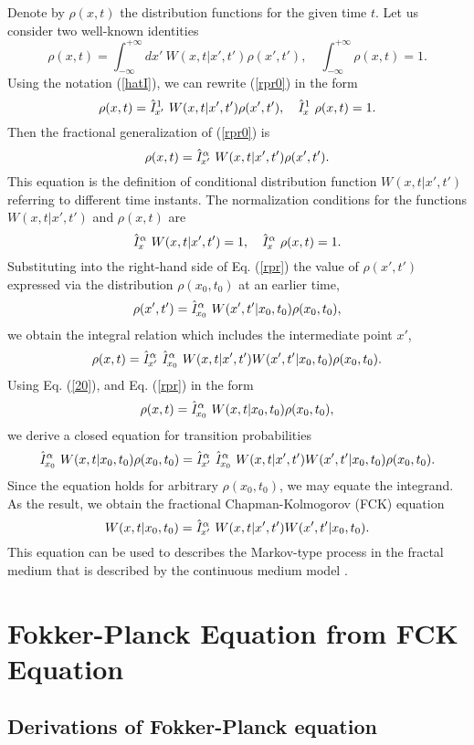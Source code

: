 \documentclass[12pt]{article}
\newcommand{\be}{\begin{equation}}
\newcommand{\ee}{\end{equation}}
\begin{document}
Denote by $\rho(x,t)$ the distribution functions for the given time $t$. 
Let us consider two well-known identities
\be  \label{rpr0} \rho(x,t) = \int^{+\infty}_{-\infty} d{x'}
\ W(x,t|x',t') \rho(x',t') , 
\quad \int^{+\infty}_{-\infty} \rho(x,t)=1 . \ee
Using the notation (\ref{hatI}), we can rewrite (\ref{rpr0})
in the form
\[  \rho(x,t) =\hat {\it I}^{1}_{x'}  \ W(x,t|x',t') \rho(x',t') , \quad
\hat {\it I}^{1}_x  \ \rho(x,t)=1 . \]
Then the fractional generalization of (\ref{rpr0}) is
\be  \label{rpr} \rho(x,t) =
\hat {\it I}^{\alpha}_{x'} \ W(x,t|x',t') \rho(x',t') . \ee
This equation is
the definition of conditional distribution function $W(x,t|x',t')$ 
referring to different time instants.
The normalization conditions for  the functions $W(x,t|x',t')$ 
and $\rho(x,t)$ are 
\be \label{nc-p} \hat {\it I}^{\alpha}_x  \ W(x,t|x',t')=1 , \quad
\hat {\it I}^{\alpha}_x  \ \rho(x,t)=1 . \ee
Substituting into the right-hand side of Eq. (\ref{rpr})
the value of $\rho(x',t')$
expressed via the distribution $\rho(x_0,t_0)$ at an earlier time,
\be  \label{rpr-2} \rho(x',t') =
\hat {\it I}^{\alpha}_{x_0}  \ W(x',t'|x_0,t_0) \rho(x_0,t_0) , \ee
we obtain the integral relation which includes the
intermediate point $x'$,
\be \label{20} \rho(x,t)=
\hat {\it I}^{\alpha}_{x'} \ \hat {\it I}^{\alpha}_{x_0}
 \  W(x,t|x',t')W(x',t'|x_0,t_0) \rho(x_0,t_0) . \ee
Using Eq. (\ref{20}), and Eq. (\ref{rpr}) in the form
\be  \label{rpr-3} \rho(x,t) =
\hat {\it I}^{\alpha}_{x_0}  \ W(x,t|x_0,t_0) \rho(x_0,t_0) , \ee
we derive a closed equation for transition
probabilities
\[ \hat {\it I}^{\alpha}_{x_0}  \ W(x,t|x_0,t_0) \rho(x_0,t_0) =
\hat {\it I}^{\alpha}_{x'}  \ \hat {\it I}^{\alpha}_{x_0}  \
W(x,t|x',t')W(x',t'|x_0,t_0) \rho(x_0,t_0) . \]
Since the equation holds for arbitrary $\rho(x_0,t_0)$,
we may equate the integrand. As the result, we obtain 
the fractional Chapman-Kolmogorov (FCK) equation 
\be W(x,t|x_0,t_0)=\hat {\it I}^{\alpha}_{x'}  \
W(x,t|x',t')W(x',t'|x_0,t_0) . \ee
This equation can be used to describes the Markov-type process 
in the fractal medium 
that is described by the continuous medium model \cite{Media}. 
 


\section{Fokker-Planck Equation from FCK Equation}

\subsection{Derivations of Fokker-Planck equation}
\end{document}
